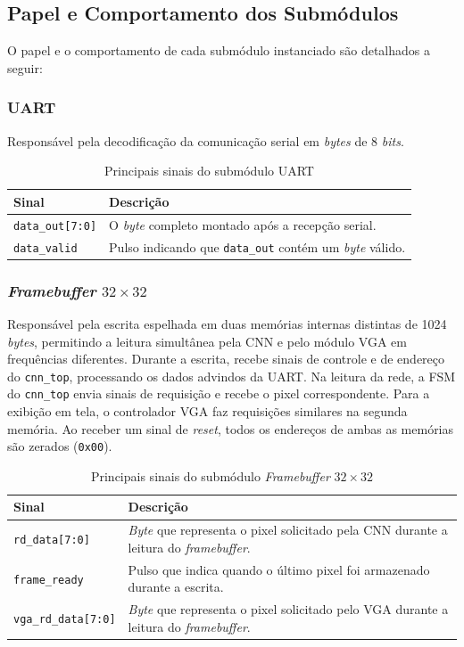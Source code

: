 \subsection{Papel e Comportamento dos Submódulos}

O papel e o comportamento de cada submódulo instanciado são detalhados a seguir:

\subsubsection{UART}
Responsável pela decodificação da comunicação serial em \textit{bytes} de 8 \textit{bits}.

\begin{table}[htbp]
\centering
\caption{Principais sinais do submódulo UART}
\label{tab:sinais_uart}
\small
\begin{tabularx}{\textwidth}{l X}
\toprule
\textbf{Sinal} & \textbf{Descrição} \\
\midrule
\texttt{data\_out[7:0]} & O \textit{byte} completo montado após a recepção serial. \\
\texttt{data\_valid} & Pulso indicando que \texttt{data\_out} contém um \textit{byte} válido. \\
\bottomrule
\end{tabularx}
\end{table}

\subsubsection{\textit{Framebuffer} $32 \times 32$}
Responsável pela escrita espelhada em duas memórias internas distintas de 1024 \textit{bytes}, permitindo a leitura simultânea pela CNN e pelo módulo VGA em frequências diferentes. Durante a escrita, recebe sinais de controle e de endereço do \texttt{cnn\_top}, processando os dados advindos da UART. Na leitura da rede, a FSM do \texttt{cnn\_top} envia sinais de requisição e recebe o pixel correspondente. Para a exibição em tela, o controlador VGA faz requisições similares na segunda memória. Ao receber um sinal de \textit{reset}, todos os endereços de ambas as memórias são zerados (\texttt{0x00}).
\begin{table}[htbp]
\centering
\caption{Principais sinais do submódulo \textit{Framebuffer} $32 \times 32$}
\label{tab:sinais_framebuffer}
\small
\begin{tabularx}{\textwidth}{l X}
\toprule
\textbf{Sinal} & \textbf{Descrição} \\
\midrule
\texttt{rd\_data[7:0]} & \textit{Byte} que representa o pixel solicitado pela CNN durante a leitura do \textit{framebuffer}. \\
\texttt{frame\_ready} & Pulso que indica quando o último pixel foi armazenado durante a escrita. \\
\texttt{vga\_rd\_data[7:0]} & \textit{Byte} que representa o pixel solicitado pelo VGA durante a leitura do \textit{framebuffer}. \\
\bottomrule
\end{tabularx}
\end{table}

